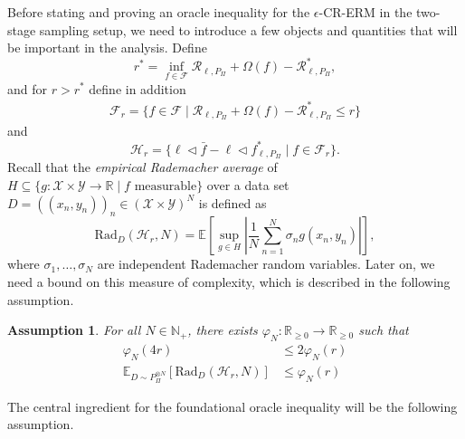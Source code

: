 \documentclass[letterpaper]{article} %
\newcommand{\R}{\mathbb{R}}
\newcommand{\Rnn}{\R_{\geq 0}}
\newcommand{\Np}{\mathbb{N}_+}
\newcommand{\E}{\mathbb{E}}
\newcommand{\distr}{\sim}
\newcommand{\inputSet}{\mathcal{X}} %
\newcommand{\outputSet}{\mathcal{Y}} %
\newcommand{\risk}{\mathcal{R}} %
\newcommand{\Risk}[2]{\risk_{{#1},{#2}}} %
\newcommand{\RiskBayes}[2]{\risk_{{#1},{#2}}^\ast} %
\newcommand{\hilbertianEmbed}{\Pi} %
\newcommand{\pipe}{\lhd}
\newcommand{\Rademacher}{\mathrm{Rad}}
\newcommand{\regularizer}{\Omega}
\newcommand{\clipped}[1]{\bar{#1}}
\newcommand{\defm}[1]{\emph{#1}}
\newtheorem{assumption}[theorem]{Assumption}
\begin{document}
Before stating and proving an oracle inequality for the $\epsilon$-CR-ERM in the two-stage sampling setup, we need to introduce a few objects and quantities that will be important in the analysis.
Define
\begin{equation}
    r^\ast = \inf_{f \in \mathcal{F}} \Risk{\ell}{P_\hilbertianEmbed} + \regularizer(f) - \RiskBayes{\ell}{P_\hilbertianEmbed},
\end{equation}
and for $r>r^\ast$ define in addition
\begin{align}
    \mathcal{F}_r = \{ f \in \mathcal{F} \mid \Risk{\ell}{P_\hilbertianEmbed} + \regularizer(f) - \RiskBayes{\ell}{P_\hilbertianEmbed} \leq r \}
\end{align}
and 
\begin{equation}
    \mathcal{H}_r = \{ \ell \pipe \clipped{f} - \ell \pipe f_{\ell,P_\hilbertianEmbed}^\ast \mid f \in \mathcal{F}_r\}.
\end{equation}
Recall that the \defm{empirical Rademacher average} of $H\subseteq\{g: \inputSet\times\outputSet \rightarrow \R \mid f \text{ measurable}\}$
over a data set $D=((x_n,y_n))_n \in(\inputSet\times\outputSet)^N$ is defined as
\begin{equation}
    \Rademacher_D(\mathcal{H}_r,N) = \E\left[\sup_{g \in H} \left| \frac1N \sum_{n=1}^N \sigma_n g(x_n,y_n) \right|\right],
\end{equation}
where $\sigma_1,\ldots,\sigma_N$ are independent Rademacher random variables.
Later on, we need a bound on this measure of complexity, which is described in the following assumption.
\begin{assumption} \label{assumption:distrslt:rademacherBoundForCRERM}
For all $N\in\Np$, there exists $\varphi_N: \Rnn \rightarrow\Rnn$ such that
\begin{align*}
    \varphi_N(4r) & \leq 2\varphi_N(r) \\
    \E_{D \distr P_\hilbertianEmbed^{\otimes N}}\left[\Rademacher_D(\mathcal{H}_r,N)\right] & \leq \varphi_N(r)
\end{align*}   
\end{assumption}
The central ingredient for the foundational oracle inequality will be the following assumption.
\end{document}
